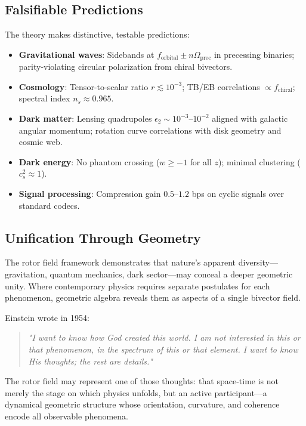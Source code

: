 \documentclass[11pt,a4paper]{article}
\numberwithin{equation}{section}
\theoremstyle{plain}
\theoremstyle{definition}
\theoremstyle{remark}
\begin{document}
\subsection{Falsifiable Predictions}

The theory makes distinctive, testable predictions:

\begin{itemize}
\item \textbf{Gravitational waves}: Sidebands at $f_{\mathrm{orbital}} \pm n\Omega_{\mathrm{prec}}$ in precessing binaries; parity-violating circular polarization from chiral bivectors.

\item \textbf{Cosmology}: Tensor-to-scalar ratio $r \lesssim 10^{-3}$; TB/EB correlations $\propto f_{\mathrm{chiral}}$; spectral index $n_s \approx 0.965$.

\item \textbf{Dark matter}: Lensing quadrupoles $\epsilon_2 \sim 10^{-3}$–$10^{-2}$ aligned with galactic angular momentum; rotation curve correlations with disk geometry and cosmic web.

\item \textbf{Dark energy}: No phantom crossing ($w \geq -1$ for all $z$); minimal clustering ($c_s^2 \approx 1$).

\item \textbf{Signal processing}: Compression gain $0.5$–$1.2$ bps on cyclic signals over standard codecs.
\end{itemize}

\subsection{Unification Through Geometry}

The rotor field framework demonstrates that nature's apparent diversity—gravitation, quantum mechanics, dark sector—may conceal a deeper geometric unity. Where contemporary physics requires separate postulates for each phenomenon, geometric algebra reveals them as aspects of a single bivector field.

Einstein wrote in 1954:

\begin{quote}
\textit{"I want to know how God created this world. I am not interested in this or that phenomenon, in the spectrum of this or that element. I want to know His thoughts; the rest are details."}
\end{quote}

The rotor field may represent one of those thoughts: that space-time is not merely the stage on which physics unfolds, but an active participant—a dynamical geometric structure whose orientation, curvature, and coherence encode all observable phenomena.
\end{document}
